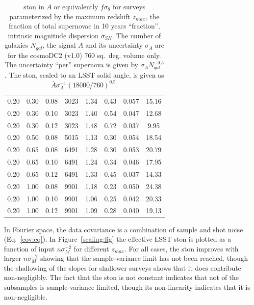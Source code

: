 \documentclass{aastex62}   	%
\begin{document}
\begin{table}
\begin{tabular}{|ccc|ccccc|}
0.20 & 0.30 & 0.08 & 3023 &   1.34 &   0.43 &  0.057 &  15.16 \\
0.20 & 0.30 & 0.10 & 3023 &   1.40 &   0.54 &  0.047 &  12.68 \\
0.20 & 0.30 & 0.12 & 3023 &   1.48 &   0.72 &  0.037 &   9.95 \\
0.20 & 0.50 & 0.08 & 5015 &   1.13 &   0.30 &  0.054 &  18.54 \\
0.20 & 0.65 & 0.08 & 6491 &   1.28 &   0.30 &  0.053 &  20.79 \\
0.20 & 0.65 & 0.10 & 6491 &   1.24 &   0.34 &  0.046 &  17.95 \\
0.20 & 0.65 & 0.12 & 6491 &   1.33 &   0.45 &  0.037 &  14.33 \\
0.20 & 1.00 & 0.08 & 9901 &   1.18 &   0.23 &  0.050 &  24.38 \\
0.20 & 1.00 & 0.10 & 9901 &   1.06 &   0.25 &  0.042 &  20.33 \\
0.20 & 1.00 & 0.12 & 9901 &   1.09 &   0.28 &  0.040 &  19.13 \\
    \hline
   \end{tabular}
   \caption{ston in $A$ or equivalently $f\sigma_8$ for surveys parameterized by the maximum redshift $z_{max}$,
   the fraction of total supernovae in 10 years ``fraction'', intrinsic magnitude dispersion $\sigma_{SN}$.  The number of galaxies
   $N_{gal}$, the signal $\bar{A}$ and its uncertainty $\sigma_A$ are for the cosmoDC2 (v1.0) 760 sq.~deg. volume only.
   The uncertainty ``per'' supernova is given by  $\sigma_A N_{gal}^{-0.5}$.  The ston, scaled to an LSST solid angle, is given as 
    $\bar{A} \sigma_A^{-1} (18000/760)^{0.5}$.
   \label{tab:subsets}}
\end{table}

In Fourier space, the data covariance is a combination of sample and shot noise (Eq.~\ref{cov:eq}).
In Figure~\ref{scaling:fig} the effective LSST ston is plotted as a function of input $n \sigma^{-2}_M$ for different $z_{max}$.
For all cases, the ston improves with larger $n \sigma^{-2}_M$ showing that the sample-variance limit has not been reached,
though the shallowing of the slopes for shallower surveys shows that it does contribute non-negligibly.
The fact that the ston is not constant indicates that not of the subsamples is sample-variance limited, though its non-linearity
indicates that it is non-negligible.
\end{document}
